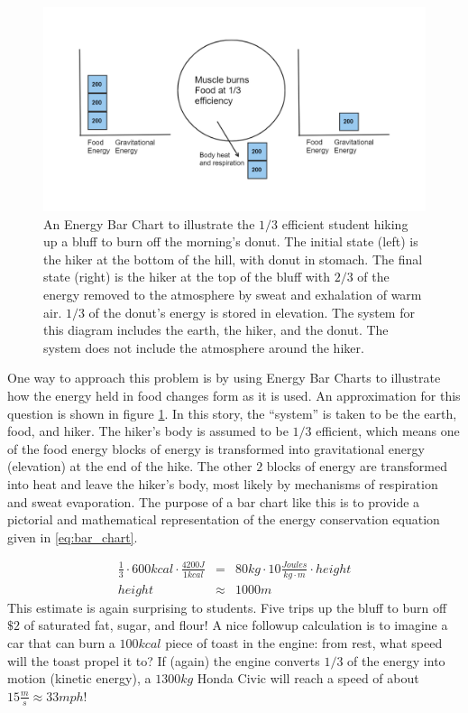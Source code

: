 \documentclass[prb,preprint]{revtex4-2}
\newcommand{\bea}{\begin{eqnarray}}
\newcommand{\eea}{\end{eqnarray}}
\begin{document}
\begin{figure}[h]
\centering
\includegraphics[width=\columnwidth]{bar_chart.png}
\caption{An Energy Bar Chart to illustrate the $1/3$ efficient student hiking up a bluff to burn off the morning's donut.  The initial state (left) is the hiker at the bottom of the hill, with donut in stomach.  The final state (right) is the hiker at the top of the bluff with $2/3$ of the energy removed to the atmosphere by sweat and exhalation of warm air. $1/3$ of the donut's energy is stored in elevation.  The system for this diagram includes the earth, the hiker, and the donut.  The system does not include the atmosphere around the hiker.  
}
\label{bar_chart}
\end{figure}

One way to approach this problem is by using Energy Bar Charts\cite{energy_bar_charts} to illustrate how the energy held in food changes form as it is used.  An approximation for this question is shown in figure \ref{bar_chart}.  
In this story, the ``system'' is taken to be the earth, food, and hiker.  The hiker's body is assumed to be $1/3$ efficient, which means one of the food energy blocks of energy is transformed into gravitational energy (elevation) at the end of the hike.  
The other $2$ blocks of energy are transformed into heat and leave the hiker's body, most likely by mechanisms of respiration and sweat evaporation. The purpose of a bar chart like this is to provide a pictorial and mathematical representation of the energy conservation equation given in \ref{eq:bar_chart}.         

\bea
\frac{1}{3}\cdot600kcal\cdot\frac{4200J}{1kcal} 
	&=& 80kg\cdot10\frac{Joules}{kg\cdot m}\cdot height \label{eq:bar_chart}\\
height &\approx&  1000 m
\eea
This estimate is again surprising to students.  Five trips up the bluff to burn off $\$2$ of saturated fat, sugar, and flour!  A nice followup calculation is to imagine a car that can burn a $100kcal$ piece of toast in the engine: from rest, what speed will the toast propel it to? If (again) the engine converts $1/3$ of the energy into motion (kinetic energy), a $1300kg$ Honda Civic will reach a speed of about $15\frac{m}{s}\approx33mph$!  
\end{document}
